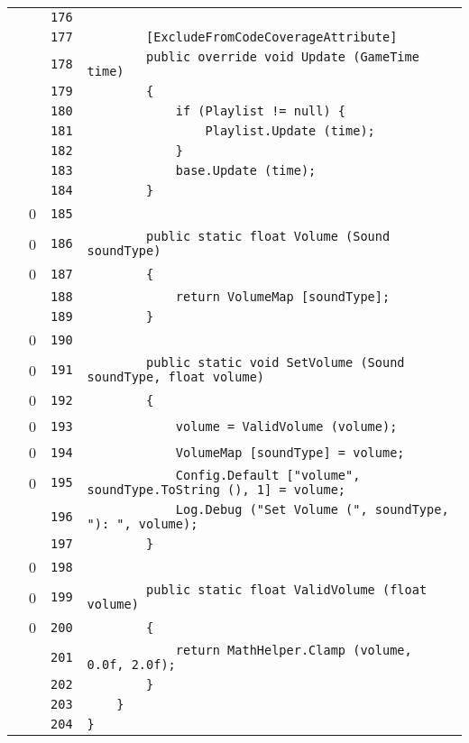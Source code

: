 \documentclass[a4paper,10pt]{article}
\begin{document}
\begin{longtable}[l]{lrrl}
\cellcolor{gray} &  & \verb~176~ & \verb~~\\
\cellcolor{gray} &  & \verb~177~ & \verb~        [ExcludeFromCodeCoverageAttribute]~\\
\cellcolor{gray} &  & \verb~178~ & \verb~        public override void Update (GameTime time)~\\
\cellcolor{gray} &  & \verb~179~ & \verb~        {~\\
\cellcolor{gray} &  & \verb~180~ & \verb~            if (Playlist != null) {~\\
\cellcolor{gray} &  & \verb~181~ & \verb~                Playlist.Update (time);~\\
\cellcolor{gray} &  & \verb~182~ & \verb~            }~\\
\cellcolor{gray} &  & \verb~183~ & \verb~            base.Update (time);~\\
\cellcolor{gray} &  & \verb~184~ & \verb~        }~\\
\cellcolor{red} & 0 & \verb~185~ & \verb~~\\
\cellcolor{red} & 0 & \verb~186~ & \verb~        public static float Volume (Sound soundType)~\\
\cellcolor{red} & 0 & \verb~187~ & \verb~        {~\\
\cellcolor{gray} &  & \verb~188~ & \verb~            return VolumeMap [soundType];~\\
\cellcolor{gray} &  & \verb~189~ & \verb~        }~\\
\cellcolor{red} & 0 & \verb~190~ & \verb~~\\
\cellcolor{red} & 0 & \verb~191~ & \verb~        public static void SetVolume (Sound soundType, float volume)~\\
\cellcolor{red} & 0 & \verb~192~ & \verb~        {~\\
\cellcolor{red} & 0 & \verb~193~ & \verb~            volume = ValidVolume (volume);~\\
\cellcolor{red} & 0 & \verb~194~ & \verb~            VolumeMap [soundType] = volume;~\\
\cellcolor{red} & 0 & \verb~195~ & \verb~            Config.Default ["volume", soundType.ToString (), 1] = volume;~\\
\cellcolor{gray} &  & \verb~196~ & \verb~            Log.Debug ("Set Volume (", soundType, "): ", volume);~\\
\cellcolor{gray} &  & \verb~197~ & \verb~        }~\\
\cellcolor{red} & 0 & \verb~198~ & \verb~~\\
\cellcolor{red} & 0 & \verb~199~ & \verb~        public static float ValidVolume (float volume)~\\
\cellcolor{red} & 0 & \verb~200~ & \verb~        {~\\
\cellcolor{gray} &  & \verb~201~ & \verb~            return MathHelper.Clamp (volume, 0.0f, 2.0f);~\\
\cellcolor{gray} &  & \verb~202~ & \verb~        }~\\
\cellcolor{gray} &  & \verb~203~ & \verb~    }~\\
\cellcolor{gray} &  & \verb~204~ & \verb~}~\\
\end{longtable}
\newpage
\end{document}
